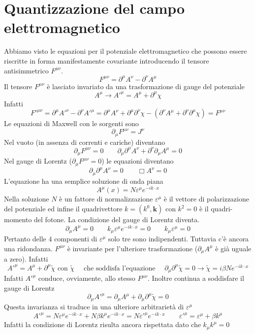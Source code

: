 \section{Quantizzazione del campo elettromagnetico}
Abbiamo visto le equazioni per il potenziale elettromagnetico che possono essere riscritte in forma manifestamente covariante introducendo il tensore antisimmetrico $F^{\mu\nu}$.
$$
F^{\mu\nu} = \partial^\mu A^\nu - \partial^\nu A^\mu
$$
Il tensore $F^{\mu\nu}$ è lasciato invariato da una trasformazione di gauge del potenziale
$$
A^\mu \to A'^\mu = A^\mu + \partial^\mu \chi
$$
Infatti
$$
F'^{\mu\nu} = \partial^\mu A'^\nu - \partial^\nu A'^\mu = \partial^\mu A^\nu + \partial^\mu\partial^\nu \chi - (\partial^\nu A^\mu + \partial^\nu\partial^\mu \chi) = F^{\mu\nu}
$$
Le equazioni di Maxwell con le sorgenti sono
$$
\partial_\mu F^{\mu\nu} = J^\nu
$$
Nel vuoto (in assenza di correnti e cariche) diventano
$$
\partial_\mu F^{\mu\nu} = 0 \qquad \partial_\mu\partial^\mu A^\nu + \partial^\nu\partial_\mu A^\mu = 0
$$
Nel gauge di Lorentz ($\partial_\mu F^{\mu\nu}=0$) le equazioni diventano
$$
\partial_\mu\partial^\mu A^\nu = 0 \qquad \Box A^\nu = 0
$$
L'equazione ha una semplice soluzione di onda piana
$$
A^\mu(x) = N \varepsilon^\mu e^{-ik\cdot x}
$$
Nella soluzione $N$ è un fattore di normalizzazione $\varepsilon^\mu$ è il vettore di polarizzazione del potenziale ed infine il quadrivettore $k=(k^0,\mathbf{k})$ con $k^2=0$ è il quadri-momento del fotone. La condizione del gauge di Lorentz diventa.
$$
\partial_\mu A^\mu = 0 \qquad k_\mu \varepsilon^\mu e^{-ik\cdot x} = 0 \qquad k_\mu \varepsilon^\mu = 0
$$
Pertanto delle $4$ componenti di $\varepsilon^\mu$ solo tre sono indipendenti. Tuttavia c'è ancora una ridondanza. $F^{\mu\nu}$ è invariante per l'ulteriore trasformazione ($\partial_\mu A^\mu$ è già uguale a zero). Infatti
$$
A'^\mu = A^\mu + \partial^\mu \tilde{\chi} \text{ con } \tilde{\chi}\quad \text{ che soddisfa l'equazione } \quad\partial_\mu \partial^\mu \tilde{\chi} = 0 \to \tilde{\chi} = i \beta N e^{-ik\cdot x}
$$
Infatti $A'^\mu$ conduce, ovviamente, allo stesso $F^{\mu\nu}$. Inoltre continua a soddisfare il gauge di Lorentz
$$
\partial_\mu A'^\mu = \partial_\mu A^\mu + \partial_\mu \partial^\mu \tilde{\chi} = 0
$$
Questa invarianza si traduce in una ulteriore arbitrarietà di $\varepsilon^\mu$
$$
A'^\mu = N \varepsilon^\mu e^{-ik\cdot x} + N \beta k^\mu e^{-ik\cdot x} = N \varepsilon'^\mu e^{-ik\cdot x} \qquad \varepsilon'^\mu = \varepsilon^\mu + \beta k^\mu
$$
Infatti la condizione di Lorentz risulta ancora rispettata dato che $k_\mu k^\mu=0$
